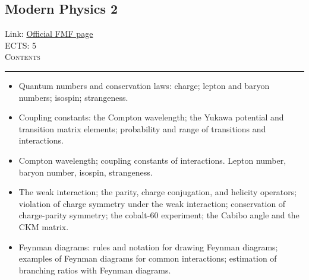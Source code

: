 \documentclass[11pt, a4paper]{article}
\newenvironment{course}[3]{
\subsection{#1}%
Link: \href{#2}{Official FMF page}\\%
ECTS: #3%
\vspace{1ex}
\\
{\large \textsc{Contents}}\\[-0.9ex]%
\rule{\textwidth}{0.5pt}
\vspace{-3ex}
}
{}
\newenvironment{chapter}[1]{
\begin{tcolorbox}[title=#1, breakable]
}
{\end{tcolorbox}}
\begin{document}
\begin{course}{Modern Physics 2}{https://www.fmf.uni-lj.si/en/study-physics/programmes/1fiz/2020/7000777/courses/1162/}{5}
\begin{chapter}{Introduction to particle physics}
\begin{itemize}
            \item Quantum numbers and conservation laws: charge; lepton and baryon numbers; isospin; strangeness.
            

            \item Coupling constants: the Compton wavelength; the Yukawa potential and transition matrix elements; probability and range of transitions and interactions.

            \item Compton wavelength; coupling constants of interactions. Lepton number, baryon number, isospin, strangeness. 

            \item The weak interaction; the parity, charge conjugation, and helicity operators; violation of charge symmetry under the weak interaction; conservation of charge-parity symmetry; the cobalt-60 experiment; the Cabibo angle and the CKM matrix.

            \item Feynman diagrams: rules and notation for drawing Feynman diagrams; examples of Feynman diagrams for common interactions; estimation of branching ratios with Feynman diagrams.

        \end{itemize}
    \end{chapter}

\end{course}
\end{document}
